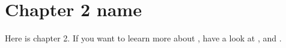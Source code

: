 \chapter{Chapter 2 name}\label{ch:ch2label}
Here is chapter 2. If you want to leearn  more about \LaTeXe{}, have a look at \cite{Madsen2010}, \cite{Oetiker2010} and \cite{WinNT}.
